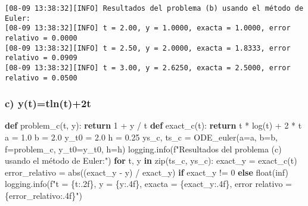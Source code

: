 \documentclass[
  letterpaper,
  DIV=11,
  numbers=noendperiod]{scrartcl}
\newenvironment{Shaded}{\begin{snugshade}}{\end{snugshade}}
\newcommand{\BuiltInTok}[1]{\textcolor[rgb]{0.00,0.23,0.31}{#1}}
\newcommand{\ControlFlowTok}[1]{\textcolor[rgb]{0.00,0.23,0.31}{\textbf{#1}}}
\newcommand{\DecValTok}[1]{\textcolor[rgb]{0.68,0.00,0.00}{#1}}
\newcommand{\FloatTok}[1]{\textcolor[rgb]{0.68,0.00,0.00}{#1}}
\newcommand{\KeywordTok}[1]{\textcolor[rgb]{0.00,0.23,0.31}{\textbf{#1}}}
\newcommand{\NormalTok}[1]{\textcolor[rgb]{0.00,0.23,0.31}{#1}}
\newcommand{\OperatorTok}[1]{\textcolor[rgb]{0.37,0.37,0.37}{#1}}
\newcommand{\SpecialCharTok}[1]{\textcolor[rgb]{0.37,0.37,0.37}{#1}}
\newcommand{\SpecialStringTok}[1]{\textcolor[rgb]{0.13,0.47,0.30}{#1}}
\newcommand{\StringTok}[1]{\textcolor[rgb]{0.13,0.47,0.30}{#1}}
\begin{document}
\begin{verbatim}
[08-09 13:38:32][INFO] Resultados del problema (b) usando el método de Euler:
[08-09 13:38:32][INFO] t = 2.00, y = 1.0000, exacta = 1.0000, error relativo = 0.0000
[08-09 13:38:32][INFO] t = 2.50, y = 2.0000, exacta = 1.8333, error relativo = 0.0909
[08-09 13:38:32][INFO] t = 3.00, y = 2.6250, exacta = 2.5000, error relativo = 0.0500
\end{verbatim}

\subsubsection{c) y(t)=tln(t)+2t}\label{c-yttlnt2t}

\begin{Shaded}
\begin{Highlighting}[]
\KeywordTok{def}\NormalTok{ problem\_c(t, y):}
    \ControlFlowTok{return} \DecValTok{1} \OperatorTok{+}\NormalTok{ y }\OperatorTok{/}\NormalTok{ t}
\KeywordTok{def}\NormalTok{ exact\_c(t):}
    \ControlFlowTok{return}\NormalTok{ t }\OperatorTok{*}\NormalTok{ log(t) }\OperatorTok{+} \DecValTok{2} \OperatorTok{*}\NormalTok{ t}
\NormalTok{a }\OperatorTok{=} \FloatTok{1.0}
\NormalTok{b }\OperatorTok{=} \FloatTok{2.0}
\NormalTok{y\_t0 }\OperatorTok{=} \FloatTok{2.0}
\NormalTok{h }\OperatorTok{=} \FloatTok{0.25}
\NormalTok{ys\_c, ts\_c }\OperatorTok{=}\NormalTok{ ODE\_euler(a}\OperatorTok{=}\NormalTok{a, b}\OperatorTok{=}\NormalTok{b, f}\OperatorTok{=}\NormalTok{problem\_c, y\_t0}\OperatorTok{=}\NormalTok{y\_t0, h}\OperatorTok{=}\NormalTok{h)}
\NormalTok{logging.info(}\SpecialStringTok{f"Resultados del problema (c) usando el método de Euler:"}\NormalTok{)}
\ControlFlowTok{for}\NormalTok{ t, y }\KeywordTok{in} \BuiltInTok{zip}\NormalTok{(ts\_c, ys\_c):}
\NormalTok{    exact\_y }\OperatorTok{=}\NormalTok{ exact\_c(t)}
\NormalTok{    error\_relativo }\OperatorTok{=} \BuiltInTok{abs}\NormalTok{((exact\_y }\OperatorTok{{-}}\NormalTok{ y) }\OperatorTok{/}\NormalTok{ exact\_y) }\ControlFlowTok{if}\NormalTok{ exact\_y }\OperatorTok{!=} \DecValTok{0} \ControlFlowTok{else} \BuiltInTok{float}\NormalTok{(}\StringTok{\textquotesingle{}inf\textquotesingle{}}\NormalTok{)}
\NormalTok{    logging.info(}\SpecialStringTok{f"t = }\SpecialCharTok{\{}\NormalTok{t}\SpecialCharTok{:.2f\}}\SpecialStringTok{, y = }\SpecialCharTok{\{}\NormalTok{y}\SpecialCharTok{:.4f\}}\SpecialStringTok{, exacta = }\SpecialCharTok{\{}\NormalTok{exact\_y}\SpecialCharTok{:.4f\}}\SpecialStringTok{, error relativo = }\SpecialCharTok{\{}\NormalTok{error\_relativo}\SpecialCharTok{:.4f\}}\SpecialStringTok{"}\NormalTok{)}
\end{Highlighting}
\end{Shaded}
\end{document}
